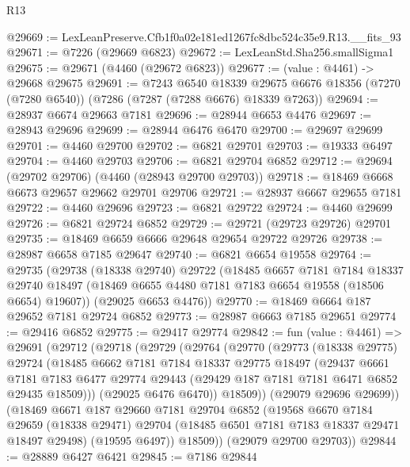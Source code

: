 \begin{lexlean}{R13}
\begin{coremodule}
@29669 := LexLeanPreserve.Cfb1f0a02e181ed1267fc8dbc524c35e9.R13.__fits_93
@29671 := @7226 (@29669 @6823)
@29672 := LexLeanStd.Sha256.smallSigma1
@29675 := @29671 (@4460 (@29672 @6823))
@29677 := (value : @4461) -> @29668 @29675
@29691 := @7243
    @6540
    @18339
    @29675
    @6676
    @18356
    (@7270 (@7280 @6540))
    (@7286 (@7287 (@7288 @6676) @18339 @7263))
@29694 := @28937 @6674 @29663 @7181
@29696 := @28944 @6653 @4476
@29697 := @28943 @29696
@29699 := @28944 @6476 @6470
@29700 := @29697 @29699
@29701 := @4460 @29700
@29702 := @6821 @29701
@29703 := @19333 @6497
@29704 := @4460 @29703
@29706 := @6821 @29704 @6852
@29712 := @29694 (@29702 @29706) (@4460 (@28943 @29700 @29703))
@29718 := @18469 @6668 @6673 @29657 @29662 @29701 @29706
@29721 := @28937 @6667 @29655 @7181
@29722 := @4460 @29696
@29723 := @6821 @29722
@29724 := @4460 @29699
@29726 := @6821 @29724 @6852
@29729 := @29721 (@29723 @29726) @29701
@29735 := @18469 @6659 @6666 @29648 @29654 @29722 @29726
@29738 := @28987 @6658 @7185 @29647
@29740 := @6821 @6654 @19558
@29764 := @29735
    (@29738
      (@18338 @29740)
      @29722
      (@18485
        @6657
        @7181
        @7184
        @18337
        @29740
        @18497
        (@18469 @6655 @4480 @7181 @7183 @6654 @19558 (@18506 @6654) @19607))
      (@29025 @6653 @4476))
@29770 := @18469 @6664 @187 @29652 @7181 @29724 @6852
@29773 := @28987 @6663 @7185 @29651
@29774 := @29416 @6852
@29775 := @29417 @29774
@29842 := fun (value : @4461) =>
  @29691
    (@29712
      (@29718
        (@29729
          (@29764
            (@29770
              (@29773
                (@18338 @29775)
                @29724
                (@18485
                  @6662
                  @7181
                  @7184
                  @18337
                  @29775
                  @18497
                  (@29437
                    @6661
                    @7181
                    @7183
                    @6477
                    @29774
                    @29443
                    (@29429 @187 @7181 @7181 @6471 @6852 @29435 @18509)))
                (@29025 @6476 @6470))
              @18509))
          (@29079 @29696 @29699))
        (@18469
          @6671
          @187
          @29660
          @7181
          @29704
          @6852
          (@19568
            @6670
            @7184
            @29659
            (@18338 @29471)
            @29704
            (@18485 @6501 @7181 @7183 @18337 @29471 @18497 @29498)
            (@19595 @6497))
          @18509))
      (@29079 @29700 @29703))
@29844 := @28889 @6427 @6421
@29845 := @7186 @29844

\end{coremodule}
\end{lexlean}
